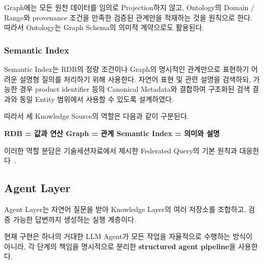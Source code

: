 \documentclass[11pt,a4paper]{article}
\begin{document}
Graph에는 모든 원천 데이터를 임의로 Projection하지 않고,
Ontology의 Domain / Range와 provenance 조건을 만족한
검증된 관계만을 적재하는 것을 원칙으로 한다.
따라서 Ontology는 Graph Schema의 의미적 계약으로도 활용된다.

\subsubsection{Semantic Index}

Semantic Index는 RDB의 정량 조건이나
Graph의 명시적인 관계만으로 표현하기 어려운
설명형 질의를 처리하기 위해 사용한다.
자연어 표현 및 관련 설명을 검색하되,
가능한 경우 product identifier 등의 Canonical Metadata와 결합하여
구조화된 검색 결과와 동일 Entity 범위에서 사용할 수 있도록 설계하였다.

따라서 세 Knowledge Source의 역할은 다음과 같이 구분된다.

\begin{center}
\textbf{RDB = 값과 연산 \qquad
Graph = 관계 \qquad
Semantic Index = 의미와 설명}
\end{center}

이러한 역할 분담은 기술세션자료에서 제시한
Federated Query의 기본 원칙과 대응한다~\cite[20--22쪽]{mirae-tech}.


\subsection{Agent Layer}

Agent Layer는 자연어 질문을 받아
Knowledge Layer의 여러 저장소를 조합하고,
검증 가능한 답변까지 생성하는 실행 계층이다.

현재 구현은 하나의 거대한 LLM Agent가
모든 작업을 자율적으로 수행하는 방식이 아니라,
각 단계의 책임을 명시적으로 분리한
\textbf{structured agent pipeline}을 사용한다.
\end{document}
